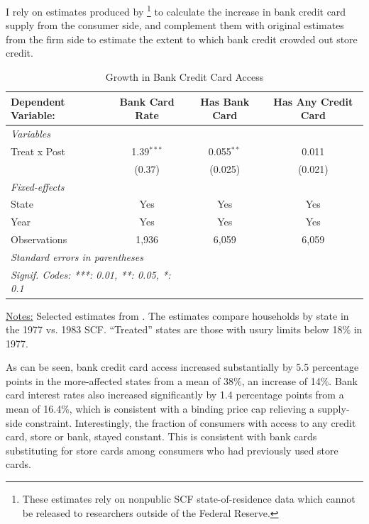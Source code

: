 \documentclass[12pt,english]{article}
\providecommand{\tabularnewline}{\\}
\begin{document}
I rely on estimates produced by \cite{zinman_impact_2003}\footnote{These estimates rely on nonpublic SCF state-of-residence data which cannot be released to researchers outside of the Federal Reserve.} to calculate the increase in bank credit card supply from the consumer side, and complement them with original estimates from the firm side to estimate the extent to which bank credit crowded out store credit. 

\begin{table}[!ht]
\caption{Growth in Bank Credit Card Access}\label{tab:zinman}

\begin{center}
    \begin{tabular}{lccc}
   \midrule 
   Dependent Variable: & Bank Card Rate & Has Bank Card & Has Any Credit Card\\  
   \midrule
  \emph{Variables}\\
   Treat x Post            & 1.39$^{***}$ &0.055$^{**}$ &0.011\\   
                       & (0.37) & (0.025) & (0.021)\\   
   \midrule
   \emph{Fixed-effects}\\
   State            & Yes  & Yes & Yes\\  
    Year            & Yes & Yes & Yes\\ 
   \midrule
   Observations        & 1,936 & 6,059 & 6,059\\  
   \midrule 
   \multicolumn{2}{l}{\emph{Standard errors in parentheses}}\\
   \multicolumn{2}{l}{\emph{Signif. Codes: ***: 0.01, **: 0.05, *: 0.1}}\\
\end{tabular}
\end{center}

\noindent \small \uline{Notes:} Selected estimates from \cite{zinman_impact_2003}. The estimates compare households by state in the 1977 vs. 1983 SCF. ``Treated'' states are those with usury limits below 18\% in 1977. 
\end{table}

As can be seen, bank credit card access increased substantially by 5.5 percentage points in the more-affected states from a mean of 38\%, an increase of 14\%. Bank card interest rates also increased significantly by 1.4 percentage points from a mean of 16.4\%, which is consistent with a binding price cap relieving a supply-side constraint. Interestingly, the fraction of consumers with access to any credit card, store or bank, stayed constant. This is consistent with bank cards substituting for store cards among consumers who had previously used store cards. 
\end{document}
